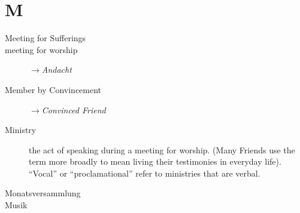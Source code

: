 \section*{M}

\articlesize

\begin{description}

 \item[Meeting for Sufferings]
 
 \item[meeting for worship]  $\to$\textit{Andacht}

 \item[Member by Convincement] $\to$\textit{Convinced Friend}
 
 \item[Ministry]
    the act of speaking during a meeting for worship. (Many Friends use the term more broadly to mean living their testimonies in everyday life). "`Vocal"' or "`proclamational"' refer to ministries that are verbal.
 
 \item[Monatsversammlung]
 
 \item[Musik]
 
 \end{description}

\normalsize
